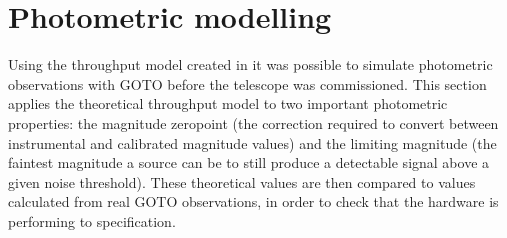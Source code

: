 
\section{Photometric modelling}
\label{sec:photometry}


\begin{colsection}

Using the throughput model created in  it was possible to simulate photometric observations with GOTO before the telescope was commissioned. This section applies the theoretical throughput model to two important photometric properties: the magnitude zeropoint (the correction required to convert between instrumental and calibrated magnitude values) and the limiting magnitude (the faintest magnitude a source can be to still produce a detectable signal above a given noise threshold). These theoretical values are then compared to values calculated from real GOTO observations, in order to check that the hardware is performing to specification.

\end{colsection}

